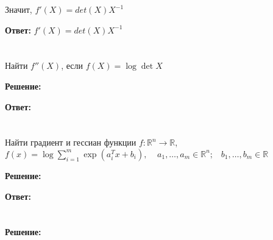 \documentclass[a4paper,12pt]{article}
\begin{document}
Значит, $f'(X) = det(X) X^{-1}$

\vspace{\baselineskip}

\textbf{Ответ:} $f'(X) = det(X) X^{-1}$

\section{}

Найти $f''(X)$, если $f(X) = \log \det X$

\vspace{\baselineskip}

\textbf{Решение:}

\vspace{\baselineskip}

\textbf{Ответ:} 

\section{}

Найти градиент и гессиан функции $f : \mathbb{R}^n \to \mathbb{R}$, $f(x) = \log \sum\limits_{i=1}^m \exp (a_i^Tx + b_i), \;\;\;\; a_1, \ldots, a_m \in \mathbb{R}^n; \;\;\;  b_1, \ldots, b_m  \in \mathbb{R}$

\vspace{\baselineskip}

\textbf{Решение:}

\vspace{\baselineskip}

\textbf{Ответ:} 




\section{}


\vspace{\baselineskip}

\textbf{Решение:}

\vspace{\baselineskip}
\end{document}
